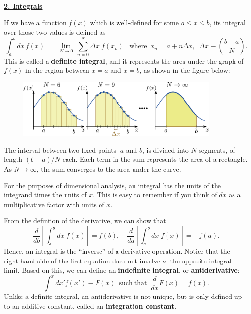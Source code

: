 \documentclass[10pt,a4paper]{article}
\begin{document}
\setcounter{page}{13}
\noindent
\underline{\textbf{\LARGE 2. Integrals}}
\vskip 0.1in

If we have a function $f(x)$ which is well-defined for some $a \le x
\le b$, its integral over those two values is defined as
\begin{equation}
\int_a^b dx\, f(x) \;=\; \lim_{N \rightarrow 0} \, \sum_{n=0}^{N} \Delta x\; f(x_n) \;\;\;\mathrm{where}\;\; x_n = a + n\Delta x, \;\; \Delta x \equiv \left(\frac{b-a}{N}\right).
\end{equation}
This is called a \textbf{definite integral}, and it represents the area
under the graph of $f(x)$ in the region between $x=a$ and $x=b$,
as shown in the figure below:

\begin{figure}[h]
  \centering\includegraphics[width=0.9\textwidth]{definite_integral}
\end{figure}

\noindent
The interval between two fixed points, $a$ and $b$, is divided into
$N$ segments, of length $(b-a)/N$ each. Each term in the sum
represents the area of a rectangle. As $N\rightarrow \infty$, the sum
converges to the area under the curve.

For the purposes of dimensional analysis, an integral has the units of
the integrand times the units of $x$. This is easy to remember if you
think of $dx$ as a multiplicative factor with units of $x$.

From the defintion of the derivative, we can show that
\begin{equation}
  \frac{d}{db} \left[\int_a^b dx\; f(x)\right] = f(b), \quad \frac{d}{da} \left[\int_a^b dx\; f(x)\right] = -f(a).
\end{equation}
Hence, an integral is the ``inverse'' of a derivative operation. Notice
that the right-hand-side of the first equation does not involve $a$,
the opposite integral limit. Based on this, we can define an
\textbf{indefinite integral}, or \textbf{antiderivative}:
\begin{equation}
  \int^x dx' f(x') \equiv F(x) \;\;\mathrm{such}\;\mathrm{that}\;\; \frac{d}{dx}F(x) = f(x).
\end{equation}
Unlike a definite integral, an antiderivative is not unique, but is
only defined up to an additive constant, called an \textbf{integration
  constant}.
\end{document}
